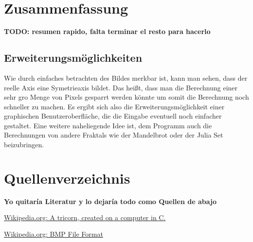 \documentclass[course=erap]{aspdoc}
\begin{document}
\section{Zusammenfassung}\label{section:zusammenfassung}

\textbf{TODO: resumen rapido, falta terminar el resto para hacerlo}

\subsection{Erweiterungsm\"oglichkeiten}

Wie durch einfaches betrachten des Bildes merkbar ist, kann man sehen, dass der reelle Axis eine Symetrieaxis bildet. Das hei{\ss}t, dass man die Berechnung einer sehr gro{\sse} Menge von Pixels gesparrt werden k\"onnte um somit die Berechnung noch schneller zu machen. Es ergibt sich also die Erweiterungsm\"oglichkeit einer graphischen Benutzeroberfläche, die die Eingabe eventuell noch einfacher gestaltet. Eine weitere naheliegende Idee ist, dem Programm auch die Berechnungen von andere Fraktals wie der Mandelbrot oder der Julia Set beizubringen.

\section{Quellenverzeichnis}\label{section:quellen}
\textbf{Yo quitaría Literatur y lo dejaría todo como Quellen de abajo}

\begin{thebibliography}{1}

 \href{https://en.wikipedia.org/wiki/Tricorn_(mathematics)#/media/File:Tricorn.png}{Wikipedia.org: A tricorn, created on a computer in C.}
 
 \href{https://en.wikipedia.org/wiki/BMP_file_format)#/media/File:Tricorn.png}{Wikipedia.org: BMP File Format}

\end{thebibliography}
\end{document}
